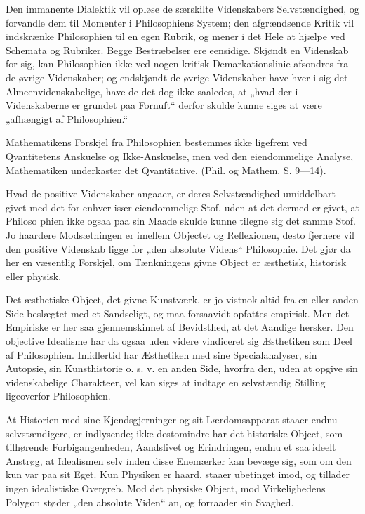 \documentclass[12pt]{book}
\newcommand{\opage}[1]{\marginnote{\footnotesize\textit{[#1]}}}
\begin{document}
Den immanente Dialektik vil opløse de særskilte Videnskabers Selvstændighed, og forvandle
dem til Momenter i Philosophiens System; den afgrændsende Kritik vil indskrænke Philosophien
til en egen Rubrik, og mener i det Hele at hjælpe ved Schemata og Rubriker. Begge
Bestræbelser ere eensidige. Skjøndt en Videnskab for sig, kan Philosophien ikke ved nogen
kritisk Demarkationslinie afsondres fra de øvrige Videnskaber; og endskjøndt de øvrige
Videnskaber have hver i sig det Almeenvidenskabelige, have de det dog ikke saaledes, at
„hvad der i Videnskaberne er grundet paa Fornuft“ derfor skulde kunne siges at være
„afhængigt af Philosophien.“

Mathematikens Forskjel fra Philosophien bestemmes ikke ligefrem ved Qvantitetens Anskuelse
og Ikke-Anskuelse, men ved den eiendommelige Analyse, Mathematiken underkaster det
Qvantitative. (Phil. og Mathem. S. 9—14).

Hvad de positive Videnskaber angaaer, er deres Selvstændighed umiddelbart givet med det for
enhver især eiendommelige Stof, uden at det dermed er givet, at Philoso%
\opage{88}phien ikke ogsaa paa sin Maade skulde kunne tilegne sig det samme Stof. Jo haardere
Modsætningen er imellem Objectet og Reflexionen, desto fjernere vil den positive Videnskab
ligge for „den absolute Videns“ Philosophie. Det gjør da her en væsentlig Forskjel, om
Tænkningens givne Object er æsthetisk, historisk eller physisk.

Det æsthetiske Object, det givne Kunstværk, er jo vistnok altid fra en eller anden Side
beslægtet med et Sandseligt, og maa forsaavidt opfattes empirisk. Men det Empiriske er her
saa gjennemskinnet af Bevidsthed, at det Aandige hersker. Den objective Idealisme har da
ogsaa uden videre vindiceret sig Æsthetiken som Deel af Philosophien. Imidlertid har
Æsthetiken med sine Specialanalyser, sin Autopsie, sin Kunsthistorie o. s. v. en anden
Side, hvorfra den, uden at opgive sin videnskabelige Charakteer, vel kan siges at indtage
en selvstændig Stilling ligeoverfor Philosophien.

At Historien med sine Kjendsgjerninger og sit Lærdomsapparat staaer endnu selvstændigere,
er indlysende; ikke destomindre har det historiske Object, som tilhørende
Forbigangenheden, Aandslivet og Erindringen, endnu et saa ideelt Anstrøg, at Idealismen
selv inden disse Enemærker kan bevæge sig, som om den kun var paa sit Eget. Kun Physiken
er haard, staaer ubetinget imod, og tillader ingen idealistiske Overgreb. Mod det physiske
Object, mod Virkelighedens Polygon støder „den absolute Viden“ an, og forraader sin
Svaghed.
\end{document}
